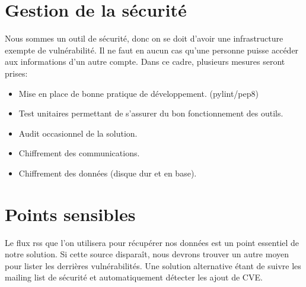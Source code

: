 \section{Gestion de la sécurité}
Nous sommes un outil de sécurité, donc on se doit d’avoir une infrastructure exempte de vulnérabilité. Il ne faut en aucun cas qu’une personne puisse accéder aux informations d’un autre compte.
Dans ce cadre, plusieurs mesures seront prises:
\begin{itemize}
\item Mise en place de bonne pratique de développement. (pylint/pep8)
\item Test unitaires permettant de s’assurer du bon fonctionnement des outils.
\item Audit occasionnel de la solution.
\item Chiffrement des communications.
\item Chiffrement des données (disque dur et en base).  
\end{itemize}


\section{Points sensibles}
Le flux rss que l’on utilisera pour récupérer nos données est un point essentiel de notre solution. Si cette source disparaît, nous devrons trouver un autre moyen pour lister les derrières vulnérabilités. Une solution alternative étant de suivre les mailing list de sécurité et automatiquement détecter les ajout de CVE.\\